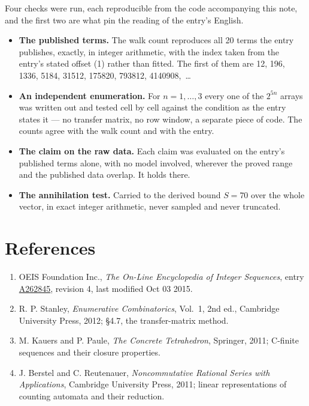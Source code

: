 \documentclass[11pt]{article}
\theoremstyle{definition}
\begin{document}
Four checks were run, each reproducible from the code accompanying this note, and the first two are what pin the reading of the entry's English.

\begin{itemize}

\item {\bfseries The published terms.} The walk count reproduces all 20 terms the entry publishes, exactly, in integer arithmetic, with the index taken from the entry's stated offset (1) rather than fitted. The first of them are 12, 196, 1336, 5184, 31512, 175820, 793812, 4140908,~\dots

\item {\bfseries An independent enumeration.} For $n = 1,\dots,3$ every one of the $2^{5n}$ arrays was written out and tested cell by cell against the condition as the entry states it --- no transfer matrix, no row window, a separate piece of code. The counts agree with the walk count and with the entry.

\item {\bfseries The claim on the raw data.} Each claim was evaluated on the entry's published terms alone, with no model involved, wherever the proved range and the published data overlap. It holds there.

\item {\bfseries The annihilation test.} Carried to the derived bound $S = 70$ over the whole vector, in exact integer arithmetic, never sampled and never truncated.

\end{itemize}

\section{References}

\begin{enumerate}

\item OEIS Foundation Inc., \emph{The On-Line Encyclopedia of Integer Sequences}, entry \href{https://oeis.org/A262845}{A262845}, revision 4, last modified Oct 03 2015.

\item R. P. Stanley, \emph{Enumerative Combinatorics}, Vol.~1, 2nd ed., Cambridge University Press, 2012; \S4.7, the transfer-matrix method.

\item M. Kauers and P. Paule, \emph{The Concrete Tetrahedron}, Springer, 2011; C-finite sequences and their closure properties.

\item J. Berstel and C. Reutenauer, \emph{Noncommutative Rational Series with Applications}, Cambridge University Press, 2011; linear representations of counting automata and their reduction.

\end{enumerate}
\end{document}
